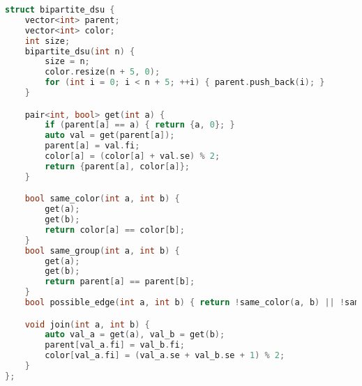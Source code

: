 \documentclass[11pt, a4paper, twoside]{article}
\begin{document}
\begin{lstlisting}[language=C++]
struct bipartite_dsu {
    vector<int> parent;
    vector<int> color;
    int size;
    bipartite_dsu(int n) {
        size = n;
        color.resize(n + 5, 0);
        for (int i = 0; i < n + 5; ++i) { parent.push_back(i); }
    }

    pair<int, bool> get(int a) {
        if (parent[a] == a) { return {a, 0}; }
        auto val = get(parent[a]);
        parent[a] = val.fi;
        color[a] = (color[a] + val.se) % 2;
        return {parent[a], color[a]};
    }

    bool same_color(int a, int b) {
        get(a);
        get(b);
        return color[a] == color[b];
    }
    bool same_group(int a, int b) {
        get(a);
        get(b);
        return parent[a] == parent[b];
    }
    bool possible_edge(int a, int b) { return !same_color(a, b) || !same_group(a, b); }

    void join(int a, int b) {
        auto val_a = get(a), val_b = get(b);
        parent[val_a.fi] = val_b.fi;
        color[val_a.fi] = (val_a.se + val_b.se + 1) % 2;
    }
};
\end{lstlisting}
\end{document}
